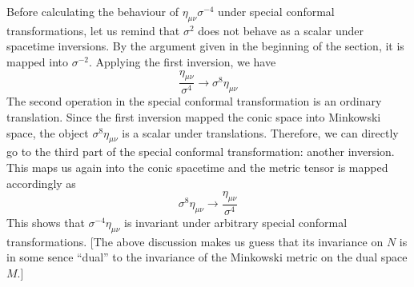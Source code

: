 \documentclass[10pt]{article}
\newcommand{\blu}{\color{blue}}
\begin{document}
Before calculating the behaviour of $\eta_{\mu\nu}\sigma^{-4}$ 
under special conformal transformations, let us remind that 
$\sigma^2$ does not behave as a scalar under spacetime 
inversions. By the argument given in the beginning of the 
section, it is mapped into $\sigma^{-2}$. Applying the first 
inversion, we have
%
\begin{displaymath}
	\frac{\eta_{\mu\nu}}{\sigma^4} \rightarrow \sigma^8 
	\eta_{\mu\nu}
\end{displaymath}
The second operation in the special conformal transformation is 
an ordinary translation. {\blu Since the first inversion mapped 
	the conic space into Minkowski space, the object $\sigma^8 
	\eta_{\mu\nu}$ is a scalar under translations.} Therefore, we 
can directly go to the third part of the special conformal 
transformation: another inversion. This maps us again into the 
conic spacetime and the metric tensor is mapped accordingly as
%
\begin{displaymath}
	\sigma^8 \eta_{\mu\nu} \rightarrow 
	\frac{\eta_{\mu\nu}}{\sigma^4}
\end{displaymath}
This shows that $\sigma^{-4} \eta_{\mu\nu}$ is invariant under 
arbitrary special conformal transformations. [The above 
discussion makes us guess that its invariance on $N$ is in some 
sence ``dual'' to the invariance of the Minkowski metric on the 
dual space $M$.]






%
%
\end{document}
